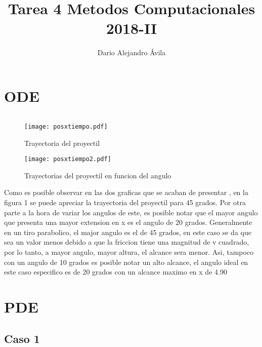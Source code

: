\documentclass[reprint,amsmath,amssymb]{revtex4-1}
\begin{document}
\title{\Huge Tarea 4 Metodos Computacionales 2018-II }

\author{Dario Alejandro Ávila }




\maketitle
\section{\label{sec:level1}ODE}

\begin{equation}

\end{equation}

\begin{figure}[h!]
    \centering
    \texttt{[image: posxtiempo.pdf]}
    \caption{Trayectoria del proyectil}

\end{figure}

\begin{figure}[h!]
    \centering
    \texttt{[image: posxtiempo2.pdf]}
    \caption{Trayectorias del proyectil en funcion del angulo}
\end{figure}

Como es posible observar en las dos graficas que se acaban de presentar , en la figura 1 se puede apreciar la trayectoria del proyectil para 45 grados. Por otra parte a la hora de variar los angulos de este, es posible notar que el mayor angulo que presenta una mayor extension en x es el angulo de 20 grados. Generalmente en un tiro parabolico, el major angulo es el de 45 grados, en este caso se da que sea un valor menos debido a que la friccion tiene una magnitud de v cuadrado, por lo tanto, a mayor angulo, mayor altura, el alcance sera menor. Asi, tampoco con un angulo de 10 grados es posible notar un alto alcance, el angulo ideal en este caso especifico es de 20 grados con un alcance maximo en x de 4.90

\section{\label{sec:level1}PDE}
\subsection{Caso 1}
\end{document}
